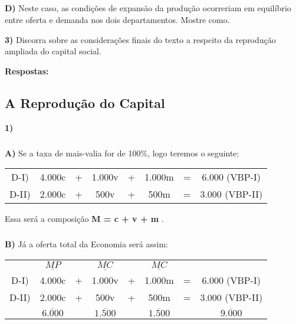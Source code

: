 \documentclass[a4paper, 12pt]{article} %
\begin{document}
\subparagraph{} \textbf{D)} Neste caso, as condições de expansão da produção ocorreriam em equilíbrio entre oferta e
demanda nos dois departamentos. Mostre como.

\vspace{0.5cm}

\par \textbf{3)}  Discorra sobre as considerações finais do texto a respeito da reprodução ampliada do capital social.

\vspace{0.5cm}

\begin{center}
\textbf{Respostas:}
\end{center}

\begin{center}
\section{A Reprodução do Capital}
\end{center}

\vspace{0.5cm}

\par \textbf{1)}

\subparagraph{} \textbf{A)} Se a taxa de mais-valia for de 100\%, logo teremos o seguinte:
\\


\begin{center}
\begin{tabular}{cccccccc}

	D-I) & 4.000c & + & 1.000v & + & 1.000m &=& 6.000 (VBP-I) \\
	D-II) & 2.000c & + & 500v & + & 500m &=& 3.000 (VBP-II)
\end{tabular}
\end{center}

Essa será a composição \textbf{M = c + v + m }.

\subparagraph{} \textbf{B)} Já a oferta total da Economia será assim: 

\begin{center}
	\begin{tabular}{cccccccc}

		& $\underline{MP}$ & & $\underline{MC}$ & & $\underline{MC}$ \\
		D-I) & 4.000c & + & 1.000v & + & 1.000m &=& 6.000 (VBP-I) \\
		D-II) & 2.000c & + & 500v & + & 500m &=& 3.000 (VBP-II) \\
		&  $\overline{6.000}$ & & $\overline{1.500}$ & & $\overline{1.500}$ & & $\overline{9.000}$
		
	\end{tabular}
\end{center}
\end{document}
